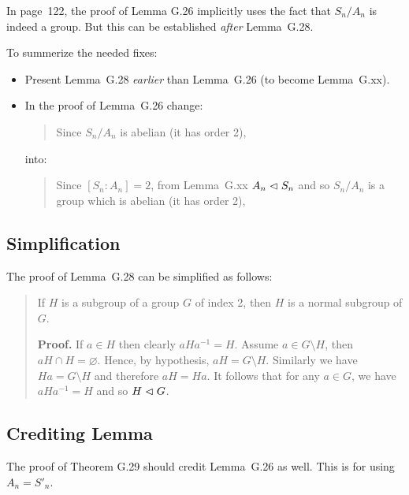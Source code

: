 In page~122, the proof of Lemma G.26 implicitly uses the fact
that \(S_n/A_n\) is indeed a group.
But this can be established \emph{after} Lemma~G.28.

To summerize the needed fixes:
\begin{itemize}
 \item Present Lemma~G.28 \emph{earlier} than Lemma~G.26
       (to become Lemma~G.xx).
 \item In the proof of Lemma~G.26 change:
   \begin{quotation}
      Since \(S_n/A_n\) is abelian (it has order 2),
   \end{quotation}
   into:
   \begin{quotation}
      Since \([S_n:A_n]=2\), from Lemma~G.xx
      \(A_n \vartriangleleft S_n\) and so \(S_n/A_n\) is a group
      which is abelian (it has order 2),
   \end{quotation}
\end{itemize}

\subsection*{Simplification}

The proof of Lemma~G.28 can be simplified as follows:

\begin{quotation}
\renewcommand{\thesection}{G}
\setcounter{quotelems}{27} %
\begin{quotelems}
If $H$ is a subgroup of a group $G$ of index 2,
then $H$ is a normal subgroup of $G$.
\end{quotelems}
\setlength{\parindent=}{0pt}
\textbf{Proof.} If \(a\in H\) then clearly \(aHa^{-1}=H\).
Assume \(a\in G\setminus H\), then \(aH\cap H = \varnothing\).
Hence, by hypothesis, \(aH=G\setminus H\).
Similarly we have \(Ha=G\setminus H\)
and therefore \(aH=Ha\).
It follows that for any \(a\in G\),
we have \(aHa^{-1}=H\) and so \(H \vartriangleleft G\). \proofend

\end{quotation}

\subsection*{Crediting Lemma}

The proof of Theorem G.29 should credit Lemma~G.26 as well.
This is for using \(A_n = S'_n\).


